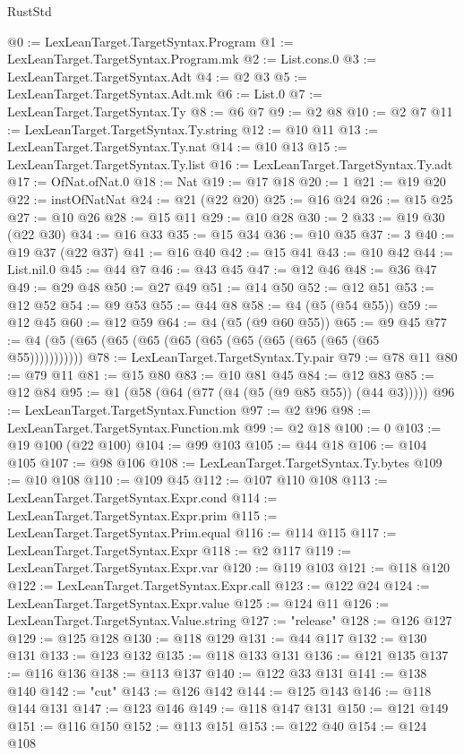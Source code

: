 \begin{lexlean}{RustStd}
\begin{coremodule}
@0 := LexLeanTarget.TargetSyntax.Program
@1 := LexLeanTarget.TargetSyntax.Program.mk
@2 := List.cons.{0}
@3 := LexLeanTarget.TargetSyntax.Adt
@4 := @2 @3
@5 := LexLeanTarget.TargetSyntax.Adt.mk
@6 := List.{0}
@7 := LexLeanTarget.TargetSyntax.Ty
@8 := @6 @7
@9 := @2 @8
@10 := @2 @7
@11 := LexLeanTarget.TargetSyntax.Ty.string
@12 := @10 @11
@13 := LexLeanTarget.TargetSyntax.Ty.nat
@14 := @10 @13
@15 := LexLeanTarget.TargetSyntax.Ty.list
@16 := LexLeanTarget.TargetSyntax.Ty.adt
@17 := OfNat.ofNat.{0}
@18 := Nat
@19 := @17 @18
@20 := 1
@21 := @19 @20
@22 := instOfNatNat
@24 := @21 (@22 @20)
@25 := @16 @24
@26 := @15 @25
@27 := @10 @26
@28 := @15 @11
@29 := @10 @28
@30 := 2
@33 := @19 @30 (@22 @30)
@34 := @16 @33
@35 := @15 @34
@36 := @10 @35
@37 := 3
@40 := @19 @37 (@22 @37)
@41 := @16 @40
@42 := @15 @41
@43 := @10 @42
@44 := List.nil.{0}
@45 := @44 @7
@46 := @43 @45
@47 := @12 @46
@48 := @36 @47
@49 := @29 @48
@50 := @27 @49
@51 := @14 @50
@52 := @12 @51
@53 := @12 @52
@54 := @9 @53
@55 := @44 @8
@58 := @4 (@5 (@54 @55))
@59 := @12 @45
@60 := @12 @59
@64 := @4 (@5 (@9 @60 @55))
@65 := @9 @45
@77 := @4 (@5 (@65 (@65 (@65 (@65 (@65 (@65 (@65 (@65 (@65 (@65 @55)))))))))))
@78 := LexLeanTarget.TargetSyntax.Ty.pair
@79 := @78 @11
@80 := @79 @11
@81 := @15 @80
@83 := @10 @81 @45
@84 := @12 @83
@85 := @12 @84
@95 := @1 (@58 (@64 (@77 (@4 (@5 (@9 @85 @55)) (@44 @3)))))
@96 := LexLeanTarget.TargetSyntax.Function
@97 := @2 @96
@98 := LexLeanTarget.TargetSyntax.Function.mk
@99 := @2 @18
@100 := 0
@103 := @19 @100 (@22 @100)
@104 := @99 @103
@105 := @44 @18
@106 := @104 @105
@107 := @98 @106
@108 := LexLeanTarget.TargetSyntax.Ty.bytes
@109 := @10 @108
@110 := @109 @45
@112 := @107 @110 @108
@113 := LexLeanTarget.TargetSyntax.Expr.cond
@114 := LexLeanTarget.TargetSyntax.Expr.prim
@115 := LexLeanTarget.TargetSyntax.Prim.equal
@116 := @114 @115
@117 := LexLeanTarget.TargetSyntax.Expr
@118 := @2 @117
@119 := LexLeanTarget.TargetSyntax.Expr.var
@120 := @119 @103
@121 := @118 @120
@122 := LexLeanTarget.TargetSyntax.Expr.call
@123 := @122 @24
@124 := LexLeanTarget.TargetSyntax.Expr.value
@125 := @124 @11
@126 := LexLeanTarget.TargetSyntax.Value.string
@127 := "release"
@128 := @126 @127
@129 := @125 @128
@130 := @118 @129
@131 := @44 @117
@132 := @130 @131
@133 := @123 @132
@135 := @118 @133 @131
@136 := @121 @135
@137 := @116 @136
@138 := @113 @137
@140 := @122 @33 @131
@141 := @138 @140
@142 := "cut"
@143 := @126 @142
@144 := @125 @143
@146 := @118 @144 @131
@147 := @123 @146
@149 := @118 @147 @131
@150 := @121 @149
@151 := @116 @150
@152 := @113 @151
@153 := @122 @40
@154 := @124 @108

\end{coremodule}
\end{lexlean}
